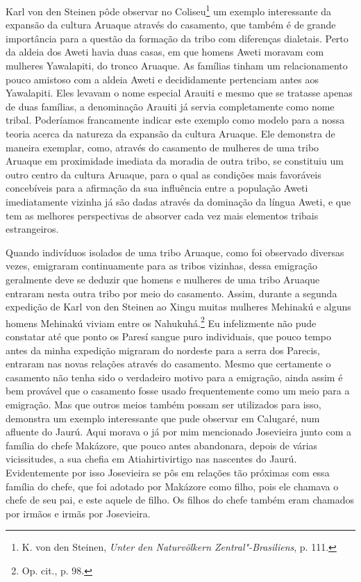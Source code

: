 Karl von den Steinen pôde observar no Coliseu\footnote{K. von den
  Steinen, \emph{Unter den Naturvölkern Zentral"-Brasiliens}, p. 111.} um
exemplo interessante da expansão da cultura Aruaque através do
casamento, que também é de grande importância para a questão da formação
da tribo com diferenças dialetais. Perto da aldeia dos Aweti havia duas
casas, em que homens Aweti moravam com mulheres Yawalapiti, do tronco
Aruaque. As famílias tinham um relacionamento pouco amistoso com a
aldeia Aweti e decididamente pertenciam antes aos Yawalapiti. Eles
levavam o nome especial Arauiti e mesmo que se tratasse apenas de duas
famílias, a denominação Arauiti já servia completamente como nome
tribal. Poderíamos francamente indicar este exemplo como modelo para a
nossa teoria acerca da natureza da expansão da cultura Aruaque. Ele
demonstra de maneira exemplar, como, através do casamento de mulheres de
uma tribo Aruaque em proximidade imediata da moradia de outra tribo, se
constituiu um outro centro da cultura Aruaque, para o qual as condições
mais favoráveis concebíveis para a afirmação da sua influência entre a
população Aweti imediatamente vizinha já são dadas através da dominação
da língua Aweti, e que tem as melhores perspectivas de absorver cada vez
mais elementos tribais estrangeiros.

Quando indivíduos isolados de uma tribo Aruaque, como foi observado
diversas vezes, emigraram continuamente para as tribos vizinhas, dessa
emigração geralmente deve se deduzir que homens e mulheres de uma tribo
Aruaque entraram nesta outra tribo por meio do casamento. Assim, durante
a segunda expedição de Karl von den Steinen ao Xingu muitas mulheres
Mehinakú e alguns homens Mehinakú viviam entre os Nahukuhá.\footnote{Op.
  cit., p. 98.} Eu infelizmente não pude constatar até que ponto os
Paresí sangue puro individuais, que pouco tempo antes da minha expedição
migraram do nordeste para a serra dos Parecis, entraram nas novas
relações através do casamento. Mesmo que certamente o casamento não
tenha sido o verdadeiro motivo para a emigração, ainda assim é bem
provável que o casamento fosse usado frequentemente como um meio para a
emigração. Mas que outros meios também possam ser utilizados para isso,
demonstra um exemplo interessante que pude observar em Calugaré, num
afluente do Jaurú. Aqui morava o já por mim mencionado Josevieira junto
com a família do chefe Makázore, que pouco antes abandonara, depois de
várias vicissitudes, a sua chefia em Atiahirtivirtigo nas nascentes do
Jaurú. Evidentemente por isso Josevieira se pôs em relações tão
próximas com essa família do chefe, que foi adotado por Makázore como
filho, pois ele chamava o chefe de seu pai, e este aquele de filho. Os
filhos do chefe também eram chamados por irmãos e irmãs por Josevieira.

